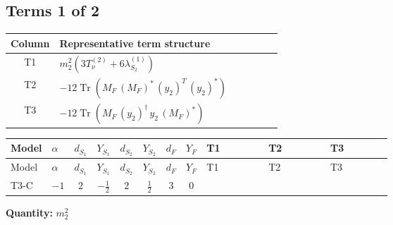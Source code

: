 \documentclass[8pt]{article}
\begin{document}
\begin{landscape}
\subsection*{Terms 1 of 2}
\begin{center}
\begin{tabular}{@{}c >{\raggedright\arraybackslash}p{0.82\linewidth}@{}}
\toprule
Column & Representative term structure \\
\midrule
T1 & \(\displaystyle {m_2^2} (3 T_{\nu}^{(2)}+6 {\lambda_{S_2}^{(1)}})\) \\
\midrule
T2 & \(\displaystyle -12 \operatorname{Tr}\!\left({M_F}\,\left({M_F}\right)^{*}\,\left({y_2}\right)^{T}\,\left({y_2}\right)^{*}\right)\) \\
\midrule
T3 & \(\displaystyle -12 \operatorname{Tr}\!\left({M_F}\,\left({y_2}\right)^{\dagger}\,{y_2}\,\left({M_F}\right)^{*}\right)\) \\
\midrule
\bottomrule
\end{tabular}
\end{center}
\smallskip
\tiny
\begin{longtable}{@{}llcccccc >{\raggedright\arraybackslash}p{0.21\linewidth} >{\raggedright\arraybackslash}p{0.21\linewidth} >{\raggedright\arraybackslash}p{0.21\linewidth}@{}}
\toprule
Model & $\alpha$ & $d_{S_1}$ & $Y_{S_1}$ & $d_{S_2}$ & $Y_{S_2}$ & $d_F$ & $Y_F$ & T1 & T2 & T3 \\
\midrule
\endfirsthead
\toprule
Model & $\alpha$ & $d_{S_1}$ & $Y_{S_1}$ & $d_{S_2}$ & $Y_{S_2}$ & $d_F$ & $Y_F$ & T1 & T2 & T3 \\
\midrule
\endhead
T3-C & $-1$ & $2$ & $-\frac{1}{2}$ & $2$ & $\frac{1}{2}$ & $3$ & $0$ & \scriptsize\adjustbox{max width=\linewidth}{$\begin{gathered} {m_2^2} (3 T_{\nu}^{(2)}+6 {\lambda_{S_2}^{(1)}})\end{gathered}$} & \scriptsize\adjustbox{max width=\linewidth}{$\begin{gathered} -12 \operatorname{Tr}\!\left({M_F}\,\left({M_F}\right)^{*}\,\left({y_2}\right)^{T}\,\left({y_2}\right)^{*}\right)\end{gathered}$} & \scriptsize\adjustbox{max width=\linewidth}{$\begin{gathered} -12 \operatorname{Tr}\!\left({M_F}\,\left({y_2}\right)^{\dagger}\,{y_2}\,\left({M_F}\right)^{*}\right)\end{gathered}$} \\
\midrule
\bottomrule
\end{longtable}
\clearpage
\noindent\textbf{Quantity: }$m_2^2$\par\smallskip

\end{landscape}
\end{document}
